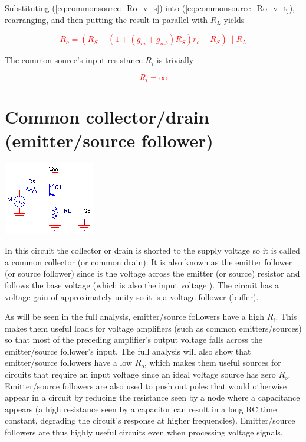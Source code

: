 \noindent Substituting (\ref{eq:commonsource_Ro_v_s}) into (\ref{eq:commonsource_Ro_v_t}), rearranging, and then putting the result in parallel with $R_{L}$ yields

\textcolor{red}{
\begin{equation}
R_{o} = (R_{S} + (1+(g_{m}+g_{mb})R_{S})r_{o}+R_{S}) \parallel R_{L}
\label{eq:commonsource_Ro}
\end{equation}
}

The common source's input resistance $R_{i}$ is trivially

\textcolor{red}{
\begin{equation}
R_{i} = \infty
\end{equation}
}

\section{Common collector/drain (emitter/source follower)}
\begin{center}
	\includegraphics{schematics/basicemitterfollower.PNG}
\end{center}

In this circuit the collector or drain is shorted to the supply voltage so it is called a common collector (or common drain). It is also known as the emitter follower (or source follower) since \vout is the voltage across the emitter (or source) resistor and follows the base voltage (which is also the input voltage \vin). The circuit has a voltage gain of approximately unity so it is a voltage follower (buffer).

As will be seen in the full analysis, emitter/source followers have a high $R_{i}$. This makes them useful loads for voltage amplifiers (such as common emitters/sources) so that most of the preceding amplifier's output voltage falls across the emitter/source follower's input. The full analysis will also show that emitter/source followers have a low $R_{o}$, which makes them useful sources for circuits that require an input voltage since an ideal voltage source has zero $R_{o}$. Emitter/source followers are also used to push out poles that would otherwise appear in a circuit by reducing the resistance seen by a node where a capacitance appears (a high resistance seen by a capacitor can result in a long RC time constant, degrading the circuit's response at higher frequencies). Emitter/source followers are thus highly useful circuits even when processing voltage signals.

